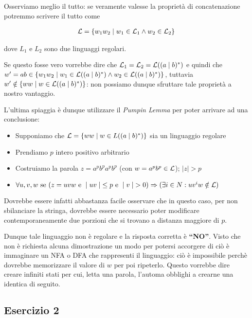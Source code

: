 \documentclass[class=book, crop=false, oneside, 12pt]{standalone}
\begin{document}
Osserviamo meglio il tutto: se veramente valesse la proprietà di concatenazione potremmo scrivere il tutto come 

\begin{align*}
    \mathcal{L} = \{w_1 w_2 \mid w_1 \in \mathcal{L}_1 \land w_2 \in \mathcal{L}_2\}
\end{align*}

dove \(L_1\) e \(L_2\) sono due linguaggi regolari. 

Se questo fosse vero vorrebbe dire che \(\mathcal{L}_1 = \mathcal{L}_2 = \mathcal{L}((a \mid b)^*)\) e quindi che \(w' = ab \in \{w_1 w_2 \mid w_1 \in \mathcal{L}((a \mid b)^*) \land w_2 \in \mathcal{L}((a \mid b)^*)\}\), tuttavia \(w' \notin \{ww \mid w \in \mathcal{L}((a \mid b)^*)\}\): non possiamo dunque sfruttare tale proprietà a nostro vantaggio.

L'ultima spiaggia è dunque utilizzare il \emph{Pumpin Lemma} per poter arrivare ad una conclusione:

\begin{itemize}
    \item Supponiamo che \(\mathcal{L} = \{ww \mid w \in L((a \mid b)^*)\}\) sia un linguaggio regolare
    \item Prendiamo \(p\) intero positivo arbitrario 
    \item Costruiamo la parola \(z = a^pb^pa^pb^p\) (con \(w = a^pb^p \in \mathcal{L}\)); \(\mid z \mid > p\)
    \item \(\forall u, v, w \textrm{ se } (z = uvw \textrm{ e } \mid uv \mid \; \leq p \textrm{ e } \mid v \mid \; > 0) \Rightarrow (\exists i \in N : uv^iw \notin \mathcal{L})\)
\end{itemize}

Dovrebbe essere infatti abbastanza facile osservare che in questo caso, per non sbilanciare la stringa, dovrebbe essere necessario poter modificare contemporaneamente due porzioni che si trovano a distanza maggiore di \(p\). 

Dunque tale linguaggio non è regolare e la risposta corretta è \textbf{“NO”}. Visto che non è richiesta alcuna dimostrazione un modo per potersi accorgere di ciò è immaginare un NFA o DFA che rappresenti il linguaggio: ciò è impossibile perchè dovrebbe memorizzare il valore di \(w\) per poi ripeterlo. Questo vorrebbe dire creare infiniti stati per cui, letta una parola, l'automa obblighi a crearne una identica di seguito. 

\subsection{Esercizio 2}
\end{document}
